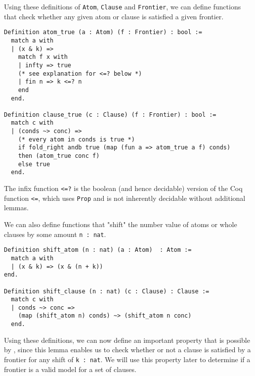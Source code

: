 Using these definitions of \lstinline{Atom}, \lstinline{Clause} and \lstinline{Frontier},
we can define functions that check whether any given atom or clause is satisfied a given frontier.

\begin{minipage}{\linewidth}
\begin{lstlisting}[language=Coq, label={lst:atom_clause_true_def}, caption={\lstinline{atom_true} and \lstinline{clause_true} in Coq}]
Definition atom_true (a : Atom) (f : Frontier) : bool :=
  match a with
  | (x & k) =>
    match f x with
    | infty => true
    (* see explanation for <=? below *)
    | fin n => k <=? n
    end
  end.

Definition clause_true (c : Clause) (f : Frontier) : bool :=
  match c with
  | (conds ~> conc) =>
    (* every atom in conds is true *)
    if fold_right andb true (map (fun a => atom_true a f) conds)
    then (atom_true conc f)
    else true
  end.
\end{lstlisting}
\end{minipage}

The infix function \lstinline{<=?} is the boolean (and hence decidable) version of the
Coq function \lstinline{<=}, which uses \lstinline{Prop} and is not inherently decidable without
additional lemmas.

We can also define functions that "shift" the number value of atoms or whole clauses by some amount \lstinline{n : nat}.

\begin{minipage}{\linewidth}
\begin{lstlisting}[language=Coq, label={lst:shift_atom_clause_true}, caption={\lstinline{shift_atom} and \lstinline{shift_clause} in Coq}]
Definition shift_atom (n : nat) (a : Atom)  : Atom :=
  match a with
  | (x & k) => (x & (n + k))
end.

Definition shift_clause (n : nat) (c : Clause) : Clause :=
  match c with
  | conds ~> conc =>
    (map (shift_atom n) conds) ~> (shift_atom n conc)
  end.
\end{lstlisting}
\end{minipage}

Using these definitions, we can now define an important property that is
possible by  \cite[p.~3]{mbezem}, since this lemma enables us to check whether or not a clause
is satisfied by a frontier for any shift of \lstinline{k : nat}.
We will use this property later to determine if a frontier is a valid model for a set of clauses.

